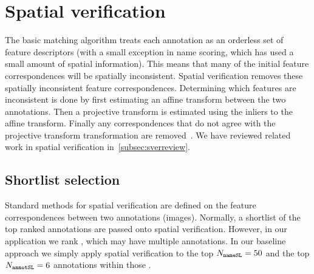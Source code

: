 
\section{Spatial verification}\label{sec:sver}

    The basic matching algorithm treats each annotation as an orderless
      set of feature descriptors (with a small exception in name scoring,
      which has used a small amount of spatial information).
    This means that many of the initial feature correspondences will be
      spatially inconsistent.
    Spatial verification removes these spatially inconsistent feature
      correspondences.
    Determining which features are inconsistent is done by first
      estimating an affine transform between the two annotations.
    Then a projective transform is estimated using the inliers to the
      affine transform.
    Finally any correspondences that do not agree with the projective
      transform transformation are removed~\cite{fischler_random_1981,
      philbin_object_2007}.
    We have reviewed related work in spatial verification
      in~\cref{subsec:sverreview}.


    \subsection{Shortlist selection}
        Standard methods for spatial verification are defined on the
          feature correspondences between two annotations (images).
        Normally, a shortlist of the top ranked annotations are passed
          onto spatial verification.
        However, in our application we rank \names{}, which may have
          multiple annotations.
        In our baseline approach we simply apply spatial verification
          to the top $N_{\tt{nameSL}}=50$ \names{} and the top
          $N_{\tt{annotSL}}=6$ annotations within those \names{}.

